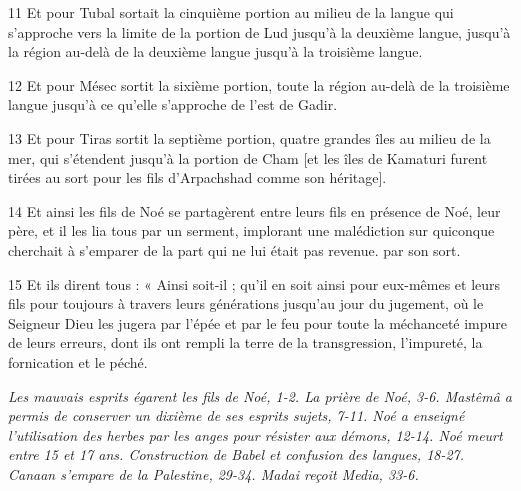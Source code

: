 \par 11 Et pour Tubal sortait la cinquième portion au milieu de la langue qui s'approche vers la limite de la portion de Lud jusqu'à la deuxième langue, jusqu'à la région au-delà de la deuxième langue jusqu'à la troisième langue.
\par 12 Et pour Mésec sortit la sixième portion, toute la région au-delà de la troisième langue jusqu'à ce qu'elle s'approche de l'est de Gadir.
\par 13 Et pour Tiras sortit la septième portion, quatre grandes îles au milieu de la mer, qui s'étendent jusqu'à la portion de Cham [et les îles de Kamaturi furent tirées au sort pour les fils d'Arpachshad comme son héritage].
\par 14 Et ainsi les fils de Noé se partagèrent entre leurs fils en présence de Noé, leur père, et il les lia tous par un serment, implorant une malédiction sur quiconque cherchait à s'emparer de la part qui ne lui était pas revenue. par son sort.
\par 15 Et ils dirent tous : « Ainsi soit-il ; qu'il en soit ainsi pour eux-mêmes et leurs fils pour toujours à travers leurs générations jusqu'au jour du jugement, où le Seigneur Dieu les jugera par l'épée et par le feu pour toute la méchanceté impure de leurs erreurs, dont ils ont rempli la terre de la transgression, l'impureté, la fornication et le péché.


\par \textit{Les mauvais esprits égarent les fils de Noé, 1-2. La prière de Noé, 3-6. Mastêmâ a permis de conserver un dixième de ses esprits sujets, 7-11. Noé a enseigné l'utilisation des herbes par les anges pour résister aux démons, 12-14. Noé meurt entre 15 et 17 ans. Construction de Babel et confusion des langues, 18-27. Canaan s'empare de la Palestine, 29-34. Madai reçoit Media, 33-6.}

